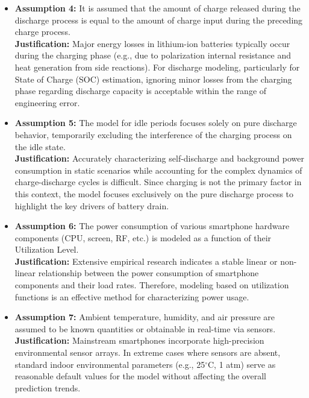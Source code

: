 \begin{itemize}
    \item \textbf{Assumption 4:} It is assumed that the amount of charge released during the discharge process is equal to the amount of charge input during the preceding charge process.\\
    \textbf{Justification:} Major energy losses in lithium-ion batteries typically occur during the charging phase (e.g., due to polarization internal resistance and heat generation from side reactions). For discharge modeling, particularly for State of Charge (SOC) estimation, ignoring minor losses from the charging phase regarding discharge capacity is acceptable within the range of engineering error.

    \item \textbf{Assumption 5:} The model for idle periods focuses solely on pure discharge behavior, temporarily excluding the interference of the charging process on the idle state.\\
    \textbf{Justification:} Accurately characterizing self-discharge and background power consumption in static scenarios while accounting for the complex dynamics of charge-discharge cycles is difficult. Since charging is not the primary factor in this context, the model focuses exclusively on the pure discharge process to highlight the key drivers of battery drain.

    \item \textbf{Assumption 6:} The power consumption of various smartphone hardware components (CPU, screen, RF, etc.) is modeled as a function of their Utilization Level.\\
    \textbf{Justification:} Extensive empirical research indicates a stable linear or non-linear relationship between the power consumption of smartphone components and their load rates. Therefore, modeling based on utilization functions is an effective method for characterizing power usage.

    \item \textbf{Assumption 7:} Ambient temperature, humidity, and air pressure are assumed to be known quantities or obtainable in real-time via sensors.\\
    \textbf{Justification:} Mainstream smartphones incorporate high-precision environmental sensor arrays. In extreme cases where sensors are absent, standard indoor environmental parameters (e.g., 25$^\circ$C, 1 atm) serve as reasonable default values for the model without affecting the overall prediction trends.
\end{itemize}

